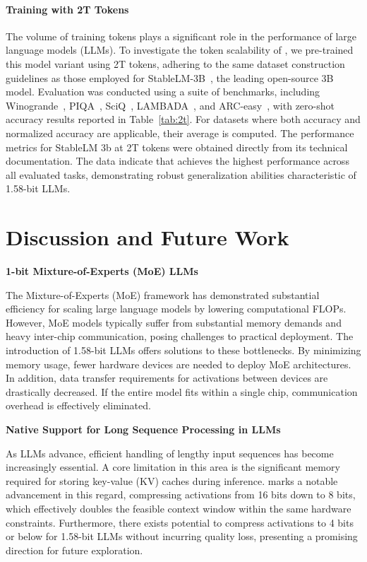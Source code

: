 \paragraph{Training with 2T Tokens}

The volume of training tokens plays a significant role in the performance of large language models (LLMs). To investigate the token scalability of , we pre-trained this model variant using 2T tokens, adhering to the same dataset construction guidelines as those employed for StableLM-3B~\cite{StableLM-3B-4E1T}, the leading open-source 3B model. Evaluation was conducted using a suite of benchmarks, including Winogrande~\cite{winoGrande}, PIQA~\cite{piqa}, SciQ~\cite{sciq}, LAMBADA~\cite{lambada}, and ARC-easy~\cite{arc}, with zero-shot accuracy results reported in Table~\ref{tab:2t}. For datasets where both accuracy and normalized accuracy are applicable, their average is computed. The performance metrics for StableLM 3b at 2T tokens were obtained directly from its technical documentation. The data indicate that  achieves the highest performance across all evaluated tasks, demonstrating robust generalization abilities characteristic of 1.58-bit LLMs.

\section{Discussion and Future Work}

\textbf{1-bit Mixture-of-Experts (MoE) LLMs}

The Mixture-of-Experts (MoE) framework has demonstrated substantial efficiency for scaling large language models by lowering computational FLOPs. However, MoE models typically suffer from substantial memory demands and heavy inter-chip communication, posing challenges to practical deployment. The introduction of 1.58-bit LLMs offers solutions to these bottlenecks. By minimizing memory usage, fewer hardware devices are needed to deploy MoE architectures. In addition, data transfer requirements for activations between devices are drastically decreased. If the entire model fits within a single chip, communication overhead is effectively eliminated.

\textbf{Native Support for Long Sequence Processing in LLMs}

As LLMs advance, efficient handling of lengthy input sequences has become increasingly essential. A core limitation in this area is the significant memory required for storing key-value (KV) caches during inference.  marks a notable advancement in this regard, compressing activations from 16 bits down to 8 bits, which effectively doubles the feasible context window within the same hardware constraints. Furthermore, there exists potential to compress activations to 4 bits or below for 1.58-bit LLMs without incurring quality loss, presenting a promising direction for future exploration.

